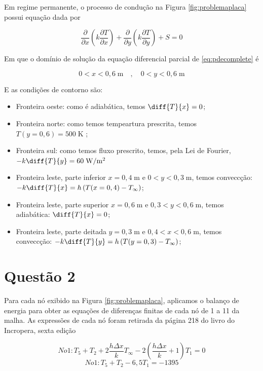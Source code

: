 \documentclass[12pt]{scrartcl}
\newcommand{\un}[1]{\;\textrm{#1}}
\begin{document}
Em regime permanente, o processo de condução na Figura \ref{fig:problemaplaca} possui 
equação dada por 

\begin{equation}\label{eq:pdecomplete}
    \frac{\partial}{\partial{x}} \left(k\frac{\partial{T}}{\partial{x}}\right) +
    \frac{\partial}{\partial{y}} \left(k\frac{\partial{T}}{\partial{y}}\right) +
    S = 0
\end{equation}

Em que o domínio de solução da equação diferencial parcial de \eqref{eq:pdecomplete} é

\begin{equation}\label{eq:domain}
    0 < x < 0,6 \un{m} \quad , \quad 0 < y < 0,6 \un{m}
\end{equation}

E as condições de contorno são:

\begin{itemize}
    \item Fronteira oeste: como é adiabática, temos $\diff{T}{x} = 0$;
    \item Fronteira norte: como temos tempeartura prescrita, temos $T(y=0,6) = 500 \un{K}$ ;
    \item Fronteira sul: como temos fluxo prescrito, temos, pela Lei de Fourier, $-k\diff{T}{y} = 60 \un{W/m$^2$}$
    \item Fronteira leste, parte inferior $x = 0,4 \un{m}$ e $0 < y < 0,3 \un{m}$, temos conveccção: $-k\diff{T}{x} = h\left(T(x=0,4) - T_{\infty}\right)$;
    \item Fronteira leste, parte superior $x = 0,6 \un{m}$ e $0,3 < y < 0,6 \un{m}$, temos adiabática: $\diff{T}{x} = 0$;
    \item Fronteira leste, parte deitada $y = 0,3 \un{m}$ e $0,4 < x < 0,6 \un{m}$, temos conveccção: $-k\diff{T}{y} = h\left(T(y=0,3) - T_{\infty}\right)$;
\end{itemize}

\section{Questão 2}

Para cada nó exibido na Figura \ref*{fig:problemaplaca}, aplicamos o balanço de energia para obter as equações de 
diferenças finitas de cada nó de 1 a 11 da malha. As expressões de cada nó foram retirada
da página 218 do livro do Incropera, sexta edição

\[  No 1: T_5 + T_2 + 2\frac{h \Delta x}{k} T_{\infty} - 2\left(\frac{h \Delta x}{k} + 1\right) T_1 = 0 \]
\[  No 1: T_5 + T_2 - 6,5 T_1 = -1395 \]
\end{document}
